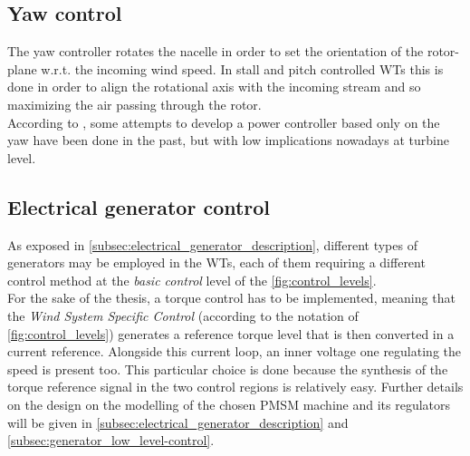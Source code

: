 \subsection{Yaw control}
The yaw controller rotates the nacelle in order to set the orientation of the rotor-plane w.r.t. the incoming wind speed. In stall and pitch controlled \acrshort{WTs} this is done in order to align the rotational axis with the incoming stream and so maximizing the air passing through the rotor. \\
According to \cite{Aerodynamics_of_wind_turbines}, some attempts to develop a power controller based only on the yaw have been done in the past, but with low implications nowadays at turbine level. 

\subsection{Electrical generator control}\label{subsec:PMSM_control}
As exposed in \autoref{subsec:electrical_generator_description}, different types of generators may be employed in the WTs, each of them requiring a different control method at the \textit{basic control} level of the \autoref{fig:control_levels}. \\
For the sake of the thesis, a torque control has to be implemented, meaning that the \textit{Wind System Specific Control} (according to the notation of \autoref{fig:control_levels}) generates a reference torque level that is then converted in a current reference. Alongside this current loop, an inner voltage one regulating the speed is present too. This particular choice is done because the synthesis of the torque reference signal in the two control regions is relatively easy. Further details on the design on the modelling of the chosen PMSM machine and its regulators will be given in \autoref{subsec:electrical_generator_description} and \autoref{subsec:generator_low_level-control}.